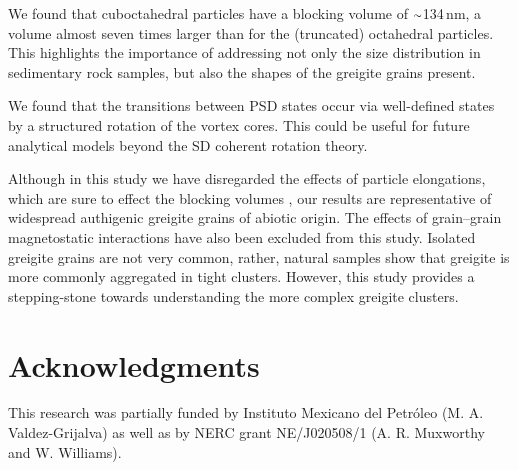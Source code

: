 \documentclass[review,authoryear]{elsarticle}
\newcommand{\roughly}{{\raise.17ex\hbox{$\scriptstyle\sim$}}}
\newcommand{\nm}{\,\text{nm}}
\begin{document}
We found that cuboctahedral particles have a blocking volume of $\roughly$134$\nm$, a volume almost seven times larger than for the (truncated) octahedral particles. This highlights the importance of addressing not only the size distribution in sedimentary rock samples, but also the shapes of the greigite grains present.\par
We found that the transitions between PSD states occur via well-defined states by a structured rotation of the vortex cores. This could be useful for future analytical models beyond the SD coherent rotation theory.\par

Although in this study we have disregarded the effects of particle elongations, which are sure to effect the blocking volumes \citep{Muxworthy2013}, our results are representative of widespread authigenic greigite grains of abiotic origin. The effects of grain--grain magnetostatic interactions have also been excluded from this study. Isolated greigite grains are not very common, rather, natural samples show that greigite is more commonly aggregated in tight clusters. However, this study provides a stepping-stone towards understanding the more complex greigite clusters.\par

\section*{Acknowledgments}
This research was partially funded by Instituto Mexicano del Petr\'oleo (M. A. Valdez-Grijalva) as well as by NERC grant NE/J020508/1 (A. R. Muxworthy and W. Williams).\par

\def\urlprefix{}

\newpage

\begin{figure}
\captionsetup{labelformat=empty}
\caption{
\label{fig1}}
\end{figure}
\end{document}

